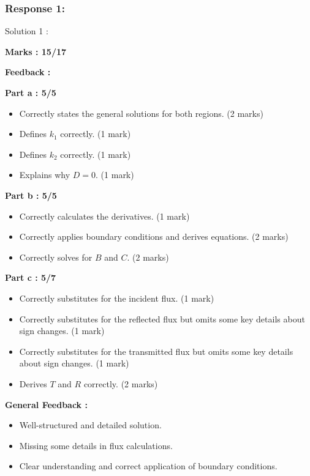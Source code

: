 \documentclass[a4paper,11pt]{article}
\begin{document}
\subsubsection*{Response 1:}

Solution 1 :

\textbf{Marks : 15/17}

\textbf{Feedback :}

\textbf{Part a : 5/5}

\begin{itemize}
    \item Correctly states the general solutions for both regions. (2 marks)
    \item Defines $k_1$ correctly. (1 mark)
    \item Defines $k_2$ correctly. (1 mark)
    \item Explains why $D = 0$. (1 mark)
\end{itemize}

\textbf{Part b : 5/5}

\begin{itemize}
    \item Correctly calculates the derivatives. (1 mark)
    \item Correctly applies boundary conditions and derives equations. (2 marks)
    \item Correctly solves for $B$ and $C$. (2 marks)
\end{itemize}

\textbf{Part c : 5/7}

\begin{itemize}
    \item Correctly substitutes for the incident flux. (1 mark)
    \item Correctly substitutes for the reflected flux but omits some key details about sign changes. (1 mark)
    \item Correctly substitutes for the transmitted flux but omits some key details about sign changes. (1 mark)
    \item Derives $T$ and $R$ correctly. (2 marks)
\end{itemize}

\textbf{General Feedback :}

\begin{itemize}
    \item Well-structured and detailed solution.
    \item Missing some details in flux calculations.
    \item Clear understanding and correct application of boundary conditions.
\end{itemize}
\end{document}
